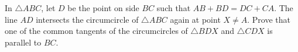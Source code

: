 In $\triangle ABC$, let $D$ be the point on side $BC$ such that $AB+BD=DC+CA.$ The line $AD$ intersects the circumcircle of $\triangle ABC$ again at point $X \neq A$. Prove that one of the common tangents of the circumcircles of $\triangle BDX$ and $\triangle CDX$ is parallel to $BC$.